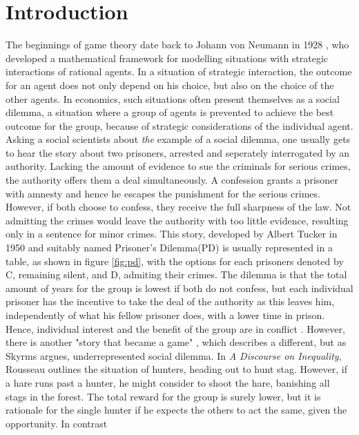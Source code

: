 \documentclass[11pt]{article}
\begin{document}
\section{Introduction}

The beginnings of game theory date back to Johann von Neumann in 1928 
\parencite{v._neumann_zur_1928}, who developed a mathematical framework
for modelling situations with strategic interactions of rational agents.
In a situation of strategic interaction, the outcome for an agent does not
only depend on his choice, but also on the choice of the other agents.
In economics, such situations often present themselves as a social dilemma,
a situation where a group of agents is prevented to achieve the best
outcome for the group, because of strategic considerations of the individual
agent.
Asking a social scientists about \textit{the} example of a social dilemma, 
one usually gets to hear the story about two prisoners, arrested and 
seperately interrogated by an authority. Lacking the amount of evidence to sue 
the criminals for serious crimes, the authority offers them a deal 
simultaneously.
A confession grants a prisoner with amnesty and hence he escapes the punishment
for the serious crimes. However, if both choose to confess, they receive the
full sharpness of the law. Not admitting the crimes would leave the authority
with too little evidence, resulting only in a sentence for minor crimes.
This story, developed by Albert Tucker in 1950 and suitably named Prisoner's
Dilemma(PD) is usually represented in a table, as shown in figure \ref{fig:pd}, with
the options for each prisoners denoted by C, remaining silent, and D, admiting
their crimes. The dilemma is that the total amount of years for the group
is lowest if both do not confess, but each individual prisoner has the 
incentive to take the deal of the authority as this leaves him, independently
of what his fellow prisoner does, with a lower time in prison. Hence, 
individual interest and the benefit of the group are in conflict
\parencite{skyrms_stag_2004}. However, there is another "story that became
a game" \parencite[1]{skyrms_stag_2004}, which describes a different, but
as Skyrms argues, underrepresented social dilemma. In \textit{A Discourse on
Inequality}, Rousseau outlines the situation of hunters, heading out to hunt 
stag. However, if a hare runs past a hunter, he might consider to
shoot the hare, banishing all stags in the forest. The total reward for
the group is surely lower, but it is rationale for the single hunter if he
expects the others to act the same, given the opportunity. In contrast
\end{document}
